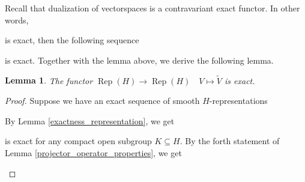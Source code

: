\documentclass[8pt]{article}
\newtheorem{lemma}{Lemma}[section]
\DeclareMathOperator{\Rep}{Rep}
\begin{document}
Recall that dualization of vectorspaces is a contravariant exact functor. In other words,

\begin{center}
\end{center}
is exact, then the following sequence
\begin{center}
\end{center}

is exact. Together with the lemma above, we derive the following lemma.

\begin{lemma}
The functor $\Rep(H)\to\Rep(H)\quad V\mapsto\widetilde{V}$ is exact.
\end{lemma}

\begin{proof}
Suppose we have an exact sequence of smooth $H$-representations
\begin{center}
\end{center}
By Lemma \ref{exactness_representation}, we get
is exact for any compact open subgroup $K\subseteq H$. By the forth statement of Lemma \ref{projector_operator_properties}, we get
\begin{center}
\end{center}
\end{proof}
\end{document}
